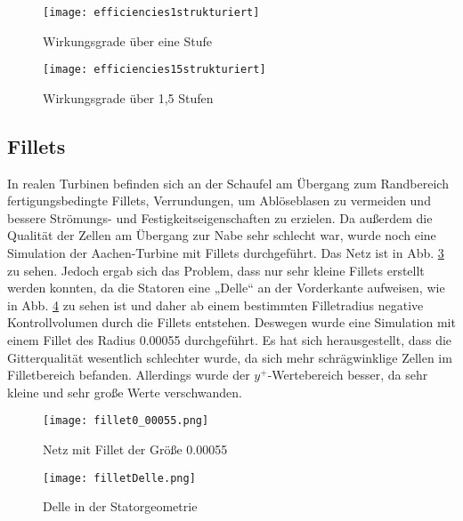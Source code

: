 \begin{figure}[H]
	\centering
	\texttt{[image: efficiencies1strukturiert]}
	\caption{Wirkungsgrade über eine Stufe} \label{fig:efficiencies1strukturiert}
\end{figure}

\begin{figure}[H]
	\centering
	\texttt{[image: efficiencies15strukturiert]}
	\caption{Wirkungsgrade über 1,5 Stufen} \label{fig:efficiencies15strukturiert}
\end{figure}


\subsection{Fillets}

In realen Turbinen befinden sich an der Schaufel am Übergang zum Randbereich fertigungsbedingte Fillets, Verrundungen, um Ablöseblasen zu vermeiden und bessere Strömungs- und Festigkeitseigenschaften zu erzielen. Da außerdem die Qualität der Zellen am Übergang zur Nabe sehr schlecht war, wurde noch eine Simulation der Aachen-Turbine mit Fillets durchgeführt. Das Netz ist in Abb. \ref{imgFillet1} zu sehen. Jedoch ergab sich das Problem, dass nur sehr kleine Fillets erstellt werden konnten, da die Statoren eine „Delle“ an der Vorderkante aufweisen, wie in Abb. \ref{imgFilletDelle} zu sehen ist und daher ab einem bestimmten Filletradius negative Kontrollvolumen durch die Fillets entstehen. Deswegen wurde eine Simulation mit einem Fillet des Radius 0.00055 durchgeführt. Es hat sich herausgestellt, dass die Gitterqualität wesentlich schlechter wurde, da sich mehr schrägwinklige Zellen im Filletbereich befanden. Allerdings wurde der $y^+$-Wertebereich besser, da sehr kleine und sehr große Werte verschwanden.     

  \begin{figure}[H]
	\centering
	\texttt{[image: fillet0\_00055.png]}
	\caption{Netz mit Fillet der Größe 0.00055} \label{imgFillet1}
\end{figure} 

  \begin{figure}[H]
	\centering
	\texttt{[image: filletDelle.png]}
	\caption{Delle in der Statorgeometrie} \label{imgFilletDelle}
\end{figure} 
